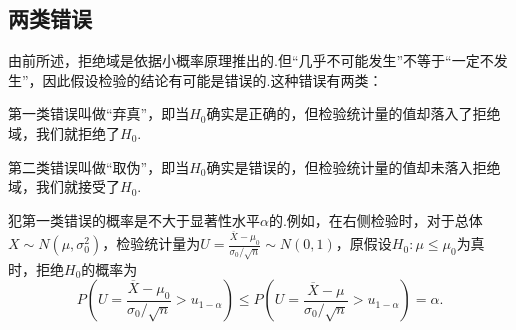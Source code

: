 \subsection{两类错误}
由前所述，拒绝域是依据小概率原理推出的.但“几乎不可能发生”不等于“一定不发生”，因此假设检验的结论有可能是错误的.这种错误有两类：

第一类错误叫做“弃真”，即当\(H_0\)确实是正确的，但检验统计量的值却落入了拒绝域，我们就拒绝了\(H_0\).

第二类错误叫做“取伪”，即当\(H_0\)确实是错误的，但检验统计量的值却未落入拒绝域，我们就接受了\(H_0\).

犯第一类错误的概率是不大于显著性水平\(\alpha\)的.例如，在右侧检验时，对于总体\(X \sim N(\mu,\sigma_0^2)\)，检验统计量为\(U = \frac{\overline{X}-\mu_0}{\sigma_0 / \sqrt{n}} \sim N(0,1)\)，原假设\(H_0: \mu\leqslant\mu_0\)为真时，拒绝\(H_0\)的概率为\[
P\left(U=\frac{\overline{X}-\mu_0}{\sigma_0 / \sqrt{n}}>u_{1-\alpha}\right) \leqslant P\left(U=\frac{\overline{X}-\mu}{\sigma_0 / \sqrt{n}}>u_{1-\alpha}\right) = \alpha.
\]
